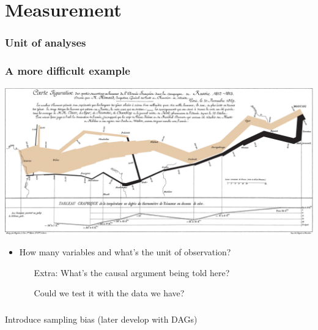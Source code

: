 \documentclass[aspectratio=43]{beamer}
\begin{document}
\section{Measurement}

\begin{frame}
\frametitle{Unit of analyses}
\centering



\end{frame}

\begin{frame}
\frametitle{A more difficult example}
\centering

\includegraphics[width = \textwidth]{img/Minard}

\vspace{10pt}

\begin{itemize}\footnotesize
  \item How many variables and what's the unit of observation?
  \begin{itemize}
    \item[Extra:] What's the causal argument being told here?
    \item[] Could we test it with the data we have?
  \end{itemize}
\end{itemize}

\end{frame}

\begin{frame}
\frametitle{}
\centering

Introduce sampling bias (later develop with DAGs)


\end{frame}
\end{document}
